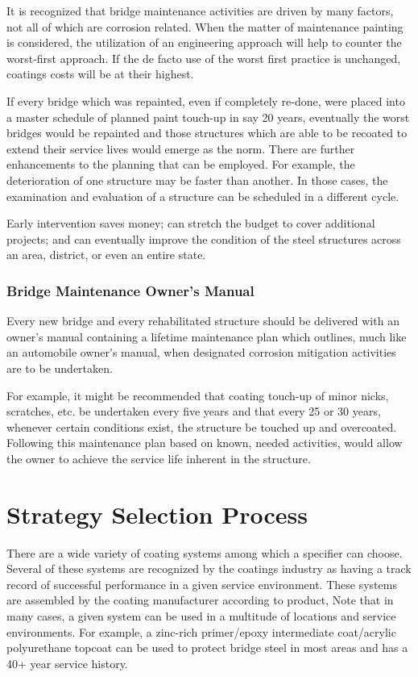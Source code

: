 It is recognized that bridge maintenance activities are driven by many factors, not all of which are corrosion
related. When the matter of maintenance painting is considered, the utilization of an engineering approach will help
to counter the worst-first approach. If the de facto use of the worst first practice is unchanged, coatings costs will be
at their highest.

If every bridge which was repainted, even if completely re-done, were placed into a master schedule of planned
paint touch-up in say 20 years, eventually the worst bridges would be repainted and those structures which are able to
be recoated to extend their service lives would emerge as the norm. There are further enhancements to the planning
that can be employed. For example, the deterioration of one structure may be faster than another. In those cases, the
examination and evaluation of a structure can be scheduled in a different cycle.

Early intervention saves money; can stretch the budget to cover additional projects; and can eventually improve
the condition of the steel structures across an area, district, or even an entire state.


\subsubsection{Bridge Maintenance Owner’s Manual}

Every new bridge and every rehabilitated structure should be delivered with an owner’s manual containing a
lifetime maintenance plan which outlines, much like an automobile owner’s manual, when designated corrosion
mitigation activities are to be undertaken.

For example, it might be recommended that coating touch-up of minor nicks, scratches, etc. be undertaken every
five years and that every 25 or 30 years, whenever certain conditions exist, the structure be touched up and
overcoated. Following this maintenance plan based on known, needed activities, would allow the owner to achieve
the service life inherent in the structure.

\section{Strategy Selection Process}
There are a wide variety of coating systems among which a specifier can choose. Several of these systems are
recognized by the coatings industry as having a track record of successful performance in a given service
environment. These systems are assembled by the coating manufacturer according to product, Note that in many
cases, a given system can be used in a multitude of locations and service environments. For example, a zinc-rich
primer/epoxy intermediate coat/acrylic polyurethane topcoat can be used to protect bridge steel in most areas and has
a 40+ year service history.


